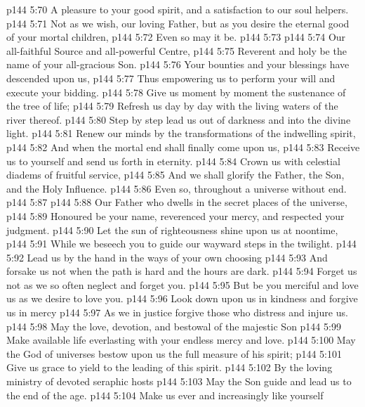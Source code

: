 \vs p144 5:70 \hsetoff A pleasure to your good spirit, and a satisfaction to our soul helpers.
\vs p144 5:71 Not as we wish, our loving Father, but as you desire the eternal good of your mortal children,
\vs p144 5:72 \hsetoff Even so may it be.
\vs p144 5:73 \separatorshort
\vs p144 5:74 Our all\hyp{}faithful Source and all\hyp{}powerful Centre,
\vs p144 5:75 \hsetoff Reverent and holy be the name of your all\hyp{}gracious Son.
\vs p144 5:76 Your bounties and your blessings have descended upon us,
\vs p144 5:77 \hsetoff Thus empowering us to perform your will and execute your bidding.
\vs p144 5:78 Give us moment by moment the sustenance of the tree of life;
\vs p144 5:79 \hsetoff Refresh us day by day with the living waters of the river thereof.
\vs p144 5:80 Step by step lead us out of darkness and into the divine light.
\vs p144 5:81 \hsetoff Renew our minds by the transformations of the indwelling spirit,
\vs p144 5:82 And when the mortal end shall finally come upon us,
\vs p144 5:83 \hsetoff Receive us to yourself and send us forth in eternity.
\vs p144 5:84 Crown us with celestial diadems of fruitful service,
\vs p144 5:85 \hsetoff And we shall glorify the Father, the Son, and the Holy Influence.
\vs p144 5:86 Even so, throughout a universe without end.
\vs p144 5:87 \separatorshort
\vs p144 5:88 Our Father who dwells in the secret places of the universe,
\vs p144 5:89 \hsetoff Honoured be your name, reverenced your mercy, and respected your judgment.
\vs p144 5:90 Let the sun of righteousness shine upon us at noontime,
\vs p144 5:91 \hsetoff While we beseech you to guide our wayward steps in the twilight.
\vs p144 5:92 Lead us by the hand in the ways of your own choosing
\vs p144 5:93 \hsetoff And forsake us not when the path is hard and the hours are dark.
\vs p144 5:94 Forget us not as we so often neglect and forget you.
\vs p144 5:95 \hsetoff But be you merciful and love us as we desire to love you.
\vs p144 5:96 Look down upon us in kindness and forgive us in mercy
\vs p144 5:97 \hsetoff As we in justice forgive those who distress and injure us.
\vs p144 5:98 May the love, devotion, and bestowal of the majestic Son
\vs p144 5:99 \hsetoff Make available life everlasting with your endless mercy and love.
\vs p144 5:100 May the God of universes bestow upon us the full measure of his spirit;
\vs p144 5:101 \hsetoff Give us grace to yield to the leading of this spirit.
\vs p144 5:102 By the loving ministry of devoted seraphic hosts
\vs p144 5:103 \hsetoff May the Son guide and lead us to the end of the age.
\vs p144 5:104 Make us ever and increasingly like yourself
